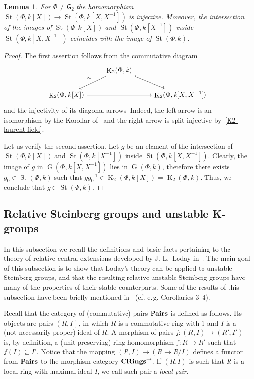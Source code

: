 \documentclass[oneside, 8pt]{amsart}
\newtheorem{lemma}{Lemma}
\theoremstyle{remark}
\theoremstyle{definition}
\numberwithin{lemma}{section}
\numberwithin{prop}{section}
\numberwithin{corollary}{section}
\numberwithin{externaltheorem}{section}
\DeclareMathOperator{\St}{St}
\DeclareMathOperator{\K}{K}
\DeclareMathOperator{\GG}{G}
\newcommand{\inv}{^{-1}}
\newcommand{\catname}[1]{{\normalfont\textbf{#1}}} %
\newcommand{\rG}{\mathsf{G}}
\numberwithin{equation}{section}
\begin{document}
\begin{lemma} \label{field-injectivity} For $\Phi\neq\rG_2$ the homomorphism $\St(\Phi, k[X]) \to \St(\Phi, k[X, X^{-1}])$ is injective. Moreover, the intersection of the images of $\St(\Phi, k[X])$ and $\St(\Phi, k[X\inv])$ inside $\St(\Phi, k[X, X\inv])$ coincides with the image of $\St(\Phi, k)$. \end{lemma}
\begin{proof} The first assertion follows from the commutative diagram
\[\begin{tikzcd}  & \K_2(\Phi, k) \arrow{dl}[swap]{\cong} \arrow[dr, hookrightarrow] & \\ \K_2(\Phi, k[X]) \arrow{rr} & & \K_2(\Phi, k[X, X^{-1}]) \end{tikzcd} \]
and the injectivity of its diagonal arrows. Indeed, the left arrow is an isomorphism by the Korollar of~\cite[Satz~1]{Re75} and the right arrow is split injective by~\cref{K2-laurent-field}.

Let us verify the second assertion. Let $g$ be an element of the intersection of $\St(\Phi, k[X])$ and $\St(\Phi, k[X\inv])$ inside $\St(\Phi, k[X, X\inv])$.
Clearly, the image of $g$ in $\GG(\Phi, k[X, X\inv])$ lies in $\GG(\Phi, k)$, therefore there exists $g_0 \in \St(\Phi, k)$ such that $gg_0^{-1} \in \K_2(\Phi, k[X]) = \K_2(\Phi, k)$. Thus, we conclude that $g \in \St(\Phi, k)$.
\end{proof}

\subsection{Relative Steinberg groups and unstable K-groups} \label{sec:quillen}
In this subsection we recall the definitions and basic facts pertaining to the theory of relative central extensions developed by J.-L.~Loday in~\cite{Lo78}. The main goal of this subsection is to show that Loday's theory can be applied to unstable Steinberg groups, and that the resulting relative unstable Steinberg groups have many of the properties of their stable counterparts. Some of the results of this subsection have been briefly mentioned in~\cite{S15} (cf. e.\,g. Corollaries 3--4).

Recall that the category of (commutative) pairs $\catname{Pairs}$ is defined as follows. Its objects are pairs $(R, I)$, in which $R$ is a commutative ring with $1$ and $I$ is a (not necessarily proper) ideal of $R$. A morphism of pairs $f \colon (R, I) \to (R', I')$ is, by definition, a (unit-preserving) ring homomorphism $f \colon R \to R'$ such that $f(I) \subseteq I'$. Notice that the mapping $(R, I) \mapsto (R \to R/I)$ defines a functor from $\catname{Pairs}$ to the morphism category $\catname{CRings}^\rightarrow$.
If $(R, I)$ is such that $R$ is a local ring with maximal ideal $I$, we call such pair a {\it local pair}.
\end{document}
